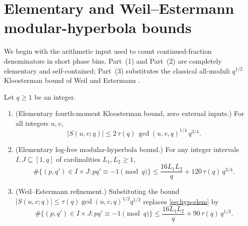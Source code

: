 \documentclass[11pt]{article}
\begin{document}
\section{Elementary and Weil--Estermann modular-hyperbola bounds}\label{sec:kloosterman}

We begin with the arithmetic input used to count continued-fraction denominators in short phase bins. Part~(1) and Part~(2) are completely elementary and self-contained; Part~(3) substitutes the classical all-moduli $q^{1/2}$ Kloosterman bound of Weil \cite{Weil1948} and Estermann \cite{Estermann1961}.

\begin{lemma}\label{lem:kloosterman}
Let $q\ge1$ be an integer.
\begin{enumerate}[label=\textup{(\arabic*)},nosep]
\item {} \textup{(Elementary fourth-moment Kloosterman bound, zero external inputs.)} For all integers $u,v$,
\begin{equation}\label{eq:klo-elem}
|S(u,v;q)|\le 2\,\tau(q)\,\gcd(u,v,q)^{1/4}\,q^{3/4}.
\end{equation}
\item {} \textup{(Elementary log-free modular-hyperbola bound.)} For any integer intervals $I,J\subseteq[1,q]$ of cardinalities $L_1,L_2\ge1$,
\begin{equation}\label{eq:hyp-elem}
\#\bigl\{(p,q')\in I\times J:pq'\equiv-1\pmod q\bigr\}\le \frac{16L_1L_2}{q}+120\,\tau(q)\,q^{3/4}.
\end{equation}
\item {} \textup{(Weil--Estermann refinement.)} Substituting the bound $|S(u,v;q)|\le\tau(q)\gcd(u,v,q)^{1/2}q^{1/2}$ replaces \eqref{eq:hyp-elem} by
\begin{equation}\label{eq:hyp-weil}
\#\bigl\{(p,q')\in I\times J:pq'\equiv-1\pmod q\bigr\}\le \frac{16L_1L_2}{q}+90\,\tau(q)\,q^{1/2}.
\end{equation}
\end{enumerate}
\end{lemma}
\end{document}
